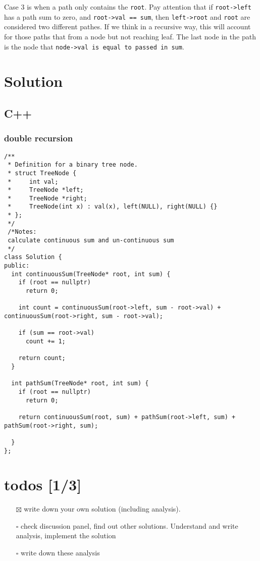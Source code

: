\documentclass[12pt]{book}
\begin{document}
Case 3 is when a path only contains the \texttt{root}. Pay attention that if \texttt{root->left} has a path sum to zero, and \texttt{root->val == sum}, then \texttt{left->root} and \texttt{root} are considered two different pathes. If we think in a recursive way, this will account for those paths that from a node but not reaching leaf. The last node in the path is the node that \texttt{node->val is equal to passed in sum}.
\section{Solution}
\label{sec:orgbfc4c32}
\subsection{C++}
\label{sec:org570fb54}
\subsubsection{double recursion}
\label{sec:orgd59e80f}
\begin{verbatim}
/**
 * Definition for a binary tree node.
 * struct TreeNode {
 *     int val;
 *     TreeNode *left;
 *     TreeNode *right;
 *     TreeNode(int x) : val(x), left(NULL), right(NULL) {}
 * };
 */
 /*Notes: 
 calculate continuous sum and un-continuous sum
 */
class Solution {
public:
  int continuousSum(TreeNode* root, int sum) {
    if (root == nullptr)
      return 0;

    int count = continuousSum(root->left, sum - root->val) + continuousSum(root->right, sum - root->val);

    if (sum == root->val)
      count += 1;

    return count;
  }

  int pathSum(TreeNode* root, int sum) {
    if (root == nullptr)
      return 0;

    return continuousSum(root, sum) + pathSum(root->left, sum) + pathSum(root->right, sum);

  }
};
\end{verbatim}
\section{todos [1/3]}
\label{sec:org076a830}
\begin{itemize}
\item[{$\boxtimes$}] write down your own solution (including analysis).
\item[{$\square$}] check discussion panel, find out other solutions. Understand and write analysis, implement the solution
\item[{$\square$}] write down these analysis
\end{itemize}
\end{document}
